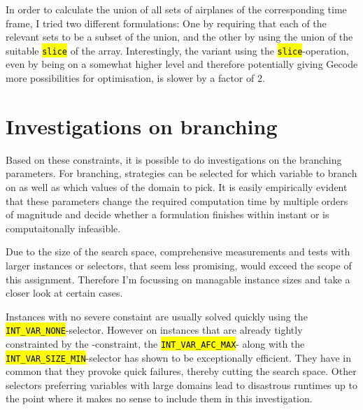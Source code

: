 \documentclass[,%
			paper=a4,%
			DIV12,
			liststotoc,
			bibtotoc,
			draft=false,%
			numbers=noendperiod
			]{scrartcl}
\newcommand{\ilc}[1]{\hl{\texttt{#1}}}
\newcommand{\mymarginnote}[1]{\marginnote{\footnotesize{#1}}}
\begin{document}
In order to calculate the union of all sets of airplanes of the corresponding time frame, I tried two different formulations: One by requiring that each of the relevant sets to be a subset of the union, and the other by using the union of the suitable \ilc{slice} of the array. Interestingly, the variant using the \ilc{slice}-operation, even by being on a somewhat higher level and therefore potentially giving Gecode more possibilities for optimisation, is slower by a factor of 2.

\section{Investigations on branching}
Based on these constraints, it is possible to do investigations on the branching parameters. 
For branching, strategies can be selected for which variable to branch on as well as which values of the domain to pick.
It is easily empirically evident that these parameters change the required computation time by multiple orders of magnitude and decide whether a formulation finishes within instant or is computaitonally infeasible.

Due to the size of the search space, comprehensive measurements and tests with larger instances or selectors, that seem less promising, would exceed the scope of this assignment. Therefore I'm focussing on managable instance sizes and take a closer look at certain cases.

Instances with no severe constaint are usually solved quickly using the \ilc{INT\_VAR\_NONE}-selector.
However on instances that are already tightly constrainted by the \Clandings-constraint, the \ilc{INT\_VAR\_AFC\_MAX}- along with the \ilc{INT\_VAR\_SIZE\_MIN}-selector has shown to be exceptionally efficient.
They have in common that they provoke quick failures, thereby cutting the search space. Other selectors preferring variables with large domains lead to disastrous runtimes up to the point where it makes no sense to include them in this investigation.
\end{document}
